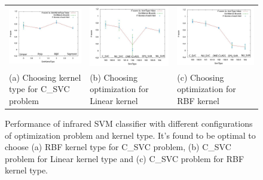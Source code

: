 \documentclass[runningheads]{llncs}
\begin{document}
\begin{figure}
  \centering
  \begin{tabular}{m{5cm}m{5cm}m{5cm}}
  \hspace{-1.5cm}
    \includegraphics[width=5cm]{img/classifier/SvmKernelTypevalue_vs_score_C_SVC.jpg} &
    \hspace{-1.5cm}
    \includegraphics[width=5cm]{img/classifier/SvmTypevalue_vs_score_LINEAR.jpg} &
    \hspace{-1.5cm}
    \includegraphics[width=5cm]{img/classifier/SvmTypevalue_vs_score_RBF.jpg} \\
    \hspace{-1.5cm}
    \tiny (a) Choosing kernel type for C\_SVC problem & 
    \hspace{-1.5cm}
    \tiny (b) Choosing optimization for Linear kernel &
    \hspace{-1.5cm}
    \tiny (c) Choosing optimization for RBF kernel
  \end{tabular}
  
  \caption{Performance of infrared SVM classifier with different configurations of optimization problem and kernel type. It's found to be optimal to choose (a) RBF kernel type for C\_SVC problem, (b) C\_SVC problem for Linear kernel type and (c) C\_SVC problem for RBF kernel type.}\label{fig:k-fold}
\end{figure}
\end{document}
